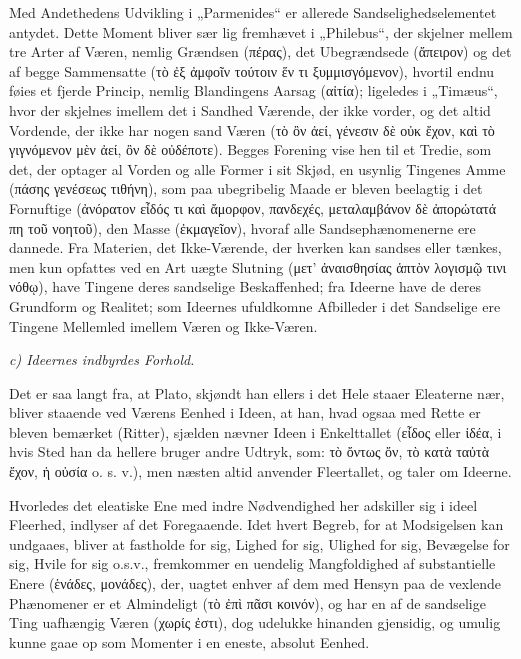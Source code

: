 \documentclass[12pt]{book}
\newcommand{\opage}[1]{\marginnote{\footnotesize\textit{[#1]}}}
\begin{document}
Med Andethedens Udvikling i „Parmenides“ er allerede Sandselighedselementet antydet. Dette Moment
bliver sær%
\opage{134}lig fremhævet i „Philebus“, der skjelner mellem tre Arter af Væren, nemlig Grændsen (πέρας), det
Ubegrændsede (ἄπειρον) og det af begge Sammensatte (τὸ ἐξ ἀμφοῖν τούτοιν ἕν τι ξυμμισγόμενον),
hvortil endnu føies et fjerde Princip, nemlig Blandingens Aarsag (αἰτία); ligeledes i „Timæus“,
hvor der skjelnes imellem det i Sandhed Værende, der ikke vorder, og det altid Vordende, der ikke
har nogen sand Væren (τὸ ὂν ἀεί, γένεσιν δὲ οὐκ ἔχον, καὶ τὸ γιγνόμενον μὲν ἀεί, ὂν δὲ οὐδέποτε).
Begges Forening vise hen til et Tredie, som det, der optager al Vorden og alle Former i sit
Skjød, en usynlig Tingenes Amme (πάσης γενέσεως τιθήνη), som paa ubegribelig Maade er bleven
beelagtig i det Fornuftige (ἀνόρατον εἶδός τι καὶ ἄμορφον, πανδεχές, μεταλαμβάνον δὲ ἀπορώτατά πη
τοῦ νοητοῦ), den Masse (ἐκμαγεῖον), hvoraf alle Sandsephænomenerne ere dannede. Fra Materien, det
Ikke-Værende, der hverken kan sandses eller tænkes, men kun opfattes ved en Art uægte Slutning
(μετ' ἀναισθησίας ἁπτὸν λογισμῷ τινι νόθῳ), have Tingene deres sandselige Beskaffenhed; fra
Ideerne have de deres Grundform og Realitet; som Ideernes ufuldkomne Afbilleder i det Sandselige
ere Tingene Mellemled imellem Væren og Ikke-Væren.

\emph{c) Ideernes indbyrdes Forhold.}

Det er saa langt fra, at Plato, skjøndt han ellers i det Hele staaer Eleaterne nær, bliver
staaende ved Værens Eenhed i Ideen, at han, hvad ogsaa med Rette er bleven bemærket (Ritter),
sjælden nævner Ideen i Enkelttallet (εἶδος eller ἰδέα, i hvis Sted han da hellere bruger andre
Udtryk, som: τὸ ὄντως ὄν, τὸ κατὰ ταὐτὰ ἔχον, ἡ οὐσία o. s. v.), men næsten altid anvender
Fleertallet, og taler om Ideerne.

Hvorledes det eleatiske Ene med indre Nødvendighed her adskiller sig i ideel Fleerhed, indlyser
af det Foregaaende. Idet hvert Begreb, for at Modsigelsen kan undgaaes, bliver at fastholde for
sig, Lighed for sig, Ulighed for sig, Bevægelse for sig, Hvile for sig o.s.v., fremkommer en
uendelig
\opage{135} Mangfoldighed af substantielle Enere (ἑνάδες, μονάδες), der, uagtet enhver af dem med Hensyn paa
de vexlende Phænomener er et Almindeligt (τὸ ἐπὶ πᾶσι κοινόν), og har en af de sandselige Ting
uafhængig Væren (χωρίς ἐστι), dog udelukke hinanden gjensidig, og umulig kunne gaae op som
Momenter i en eneste, absolut Eenhed.
\end{document}
